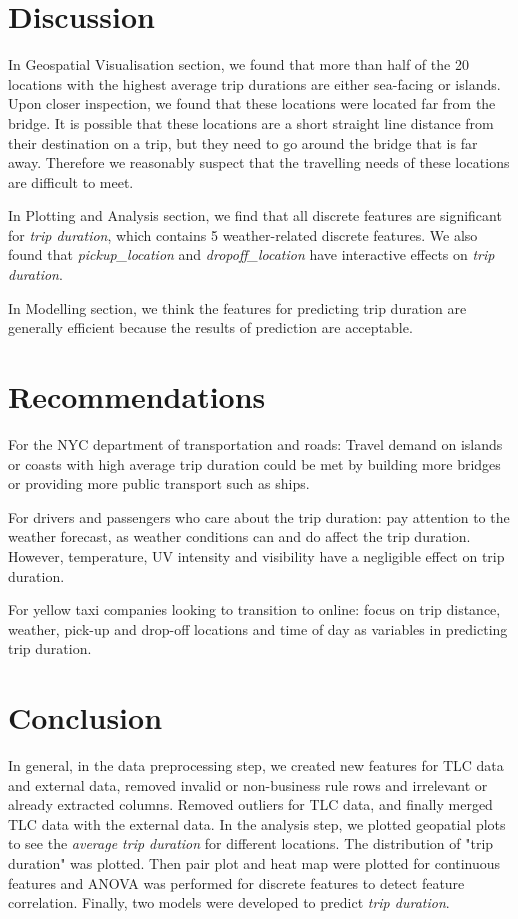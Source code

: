 \documentclass[11pt]{article}
\begin{document}
\section{Discussion}
\label{sec:discussion}
In Geospatial Visualisation section, we found that more than half of the 20 locations with the highest average trip durations are either sea-facing or islands. Upon closer inspection, we found that these locations were located far from the bridge. It is possible that these locations are a short straight line distance from their destination on a trip, but they need to go around the bridge that is far away. Therefore we reasonably suspect that the travelling needs of these locations are difficult to meet.

In Plotting and Analysis section, we find that all discrete features are significant for \textit{trip duration}, which contains 5 weather-related discrete features. We also found that \textit{pickup\_location} and \textit{dropoff\_location} have interactive effects on \textit{trip duration}.

In Modelling section, we think the features for predicting trip duration are generally efficient because the results of prediction are acceptable.

\section{Recommendations}
For the NYC department of transportation and roads: Travel demand on islands or coasts with high average trip duration could be met by building more bridges or providing more public transport such as ships.

For drivers and passengers who care about the trip duration: pay attention to the weather forecast, as weather conditions can and do affect the trip duration. However, temperature, UV intensity and visibility have a negligible effect on trip duration.

For yellow taxi companies looking to transition to online: focus on trip distance, weather, pick-up and drop-off locations and time of day as variables in predicting trip duration.


\section{Conclusion}
In general, in the data preprocessing step, we created new features for TLC data and external data, removed invalid or non-business rule rows and irrelevant or already extracted columns. Removed outliers for TLC data, and finally merged TLC data with the external data. In the analysis step, we plotted geopatial plots to see the \textit{average trip duration} for different locations. The distribution of "trip duration" was plotted. Then pair plot and heat map were plotted for continuous features and ANOVA was performed for discrete features to detect feature correlation. Finally, two models were developed to predict \textit{trip duration}.

\clearpage

\printbibliography
\end{document}
